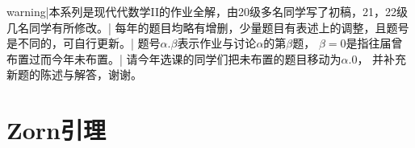 {{warning|本系列是现代代数学II的作业全解，由20级多名同学写了初稿，21，22级几名同学有所修改。|
每年的题目均略有增删，少量题目有表述上的调整，且题号是不同的，可自行更新。|
题号$\alpha.\beta$表示作业与讨论$\alpha$的第$\beta$题，
$\beta=0$是指往届曾布置过而今年未布置。|
请今年选课的同学们把未布置的题目移动为$\alpha.0$，
并补充新题的陈述与解答，谢谢。}}

\section{Zorn引理}
